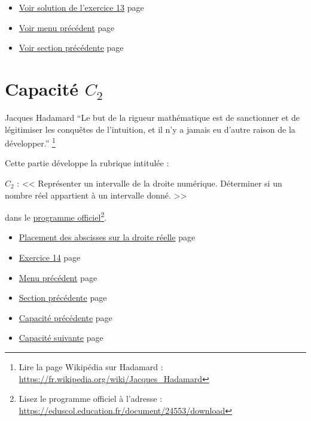 \documentclass[a4paper,11pt]{book}
\begin{document}
\begin{itemize}
\item \hyperref[orgcc6458f]{Voir solution de l'exercice 13}
page~\pageref{page:sec9.1.1sols13}
\item \hyperref[orgccf1b93]{Voir menu précédent}
page~\pageref{page:capacity1-menu}
\item \hyperref[orgd1ad3aa]{Voir section précédente}
page~\pageref{page:sec3.2.1pts}
\end{itemize}


\clearpage

\chapter{Capacité \(C_2\)}
\label{sec:orgb107152}
\label{org3ab5664}
\label{page:sec3.3capacity2}

\begin{myquote}{Jacques Hadamard}
\enquote{Le but de la rigueur mathématique est de sanctionner et de
légitimiser les conquêtes de l'intuition, et il n'y a  jamais eu
d'autre raison de la développer.}
\footnote{Lire la page Wikipédia sur Hadamard : \url{https://fr.wikipedia.org/wiki/Jacques_Hadamard}}
\end{myquote}

\clearpage

Cette partie développe la rubrique intitulée :

\(C_{2}\) : << Représenter un intervalle de la droite numérique.
Déterminer si un nombre réel appartient à un intervalle donné. >>

dans le \href{https://eduscol.education.fr/document/24553/download}{programme officiel}\footnote{Lisez le programme officiel à l'adresse :
\url{https://eduscol.education.fr/document/24553/download}}.

\clearpage

\label{org449ea02}
\label{page:capacity2-menu}
\begin{itemize}
\item \hyperref[org873e05f]{Placement des abscisses sur la droite réelle} page
\pageref{page:sec3.3.1x-axis}
\item \hyperref[org7d5ffab]{Exercice 14} page \pageref{page:sec3.3.2exo14}
\item \hyperref[orgb90956a]{Menu précédent} page \pageref{page:capacities-menu}
\item \hyperref[org6da0729]{Section précédente} page \pageref{page:sec3.2.2exo13}
\item \hyperref[org8554f1b]{Capacité précédente} page \pageref{page:sec3.2capacity1}
\item \hyperref[org376c46d]{Capacité suivante} page \pageref{page:sec3.4capacity3}
\end{itemize}
\end{document}
